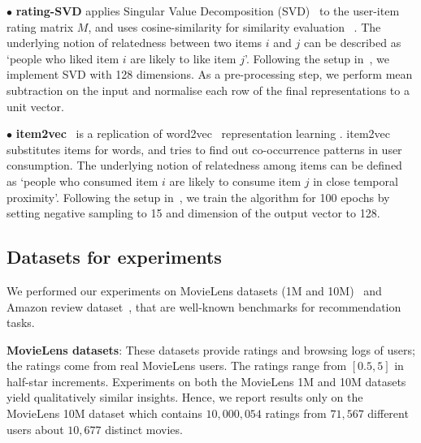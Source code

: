\vspace{1 mm}
$\bullet$ \textbf{rating-SVD} applies Singular Value Decomposition (SVD)~\cite{sarwar2000application} to the user-item rating matrix $M$, and uses cosine-similarity for similarity evaluation%
~\cite{sarwar2001item}. %
The underlying notion of relatedness between two items $i$ and $j$ can be described as `people who liked item $i$ are likely to like item $j$'. 
Following the setup in~\cite{yao2018judging}, we implement SVD with 128 dimensions. As a pre-processing step, we perform mean subtraction on the input and normalise each row of the final representations to a unit vector.

\vspace{1 mm}
$\bullet$ \textbf{item2vec}~\cite{barkan2016item2vec} is a replication of word2vec~\cite{mikolov2013distributed} representation learning%
. item2vec substitutes items for words, and tries to find out co-occurrence patterns in user consumption. 
The underlying notion of relatedness among items can be defined as `people who consumed item $i$ are likely to consume item $j$ in close temporal proximity'. 
Following the setup in~\cite{yao2018judging}, we train the algorithm for 100 epochs by setting negative sampling to 15 and dimension of the output vector to 128. 

\subsection{Datasets for experiments} 
We performed our experiments on %
MovieLens datasets (1M and 10M)~\cite{harper2016movielens} and Amazon review dataset~\cite{he2016ups}, that are well-known benchmarks for recommendation tasks. 

\vspace{1 mm}
\noindent
\textbf{MovieLens datasets}: These datasets provide ratings and browsing logs of users;
the ratings come from real MovieLens users. 
The ratings range from $[0.5, 5]$ in half-star increments. 
Experiments on both the MovieLens 1M and 10M datasets yield qualitatively similar insights. %
Hence, we report results only on the MovieLens 10M dataset which contains $10,000,054$ ratings from $71,567 $ different users about $10,677$ distinct movies. 

